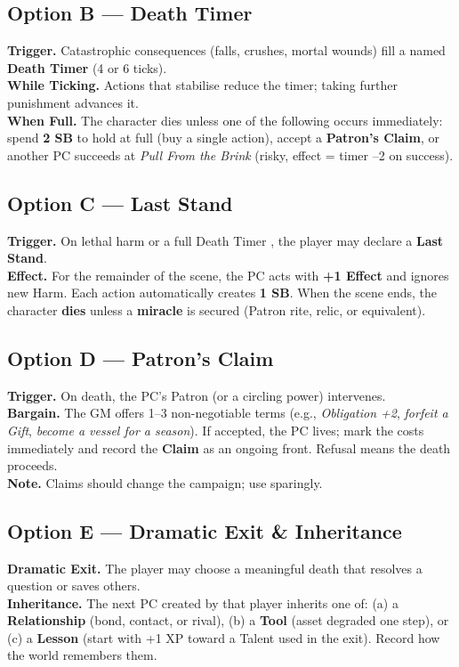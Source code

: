\subsection*{Option B --- Death Timer }
\textbf{Trigger.} Catastrophic consequences (falls, crushes, mortal wounds) fill a named \textbf{Death Timer } (4 or 6 ticks).\\
\textbf{While Ticking.} Actions that stabilise reduce the timer; taking further punishment advances it.\\
\textbf{When Full.} The character dies unless one of the following occurs immediately: spend \textbf{2 SB} to hold at full (buy a single action), accept a \textbf{Patron's Claim}, or another PC succeeds at \emph{Pull From the Brink} (risky, effect = timer --2 on success).

\subsection*{Option C --- Last Stand}
\textbf{Trigger.} On lethal harm or a full Death Timer , the player may declare a \textbf{Last Stand}.\\
\textbf{Effect.} For the remainder of the scene, the PC acts with \textbf{+1 Effect} and ignores new Harm. Each action automatically creates \textbf{1 SB}. When the scene ends, the character \textbf{dies} unless a \textbf{miracle} is secured (Patron rite, relic, or equivalent).

\subsection*{Option D --- Patron's Claim}
\textbf{Trigger.} On death, the PC's Patron (or a circling power) intervenes.\\
\textbf{Bargain.} The GM offers 1--3 non-negotiable terms (e.g., \emph{Obligation +2}, \emph{forfeit a Gift}, \emph{become a vessel for a season}). If accepted, the PC lives; mark the costs immediately and record the \textbf{Claim} as an ongoing front. Refusal means the death proceeds.\\
\textbf{Note.} Claims should change the campaign; use sparingly.

\subsection*{Option E --- Dramatic Exit \& Inheritance}
\textbf{Dramatic Exit.} The player may choose a meaningful death that resolves a question or saves others.\\
\textbf{Inheritance.} The next PC created by that player inherits one of: (a) a \textbf{Relationship} (bond, contact, or rival), (b) a \textbf{Tool} (asset degraded one step), or (c) a \textbf{Lesson} (start with +1 XP toward a Talent used in the exit). Record how the world remembers them.

